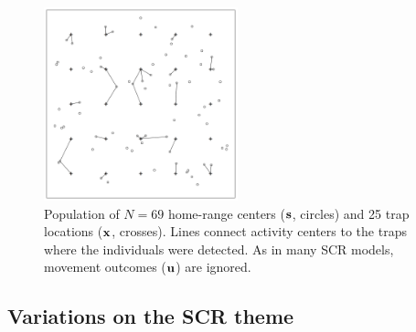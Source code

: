 \begin{figure}
\begin{center}
\includegraphics[width=0.5\textwidth]{Ch2/figs/SCR0}
\end{center}
\caption{Population of $N=69$ home-range centers ($\bf s$,
  circles) and 25 trap locations ($\bf x$, crosses). Lines connect
  activity centers to the traps where the individuals were
  detected. As in many SCR models, movement outcomes ($\bf u$)
  are ignored.}
\label{modeling.fig.fig1}
\end{figure}

\subsection{Variations on the SCR theme}

